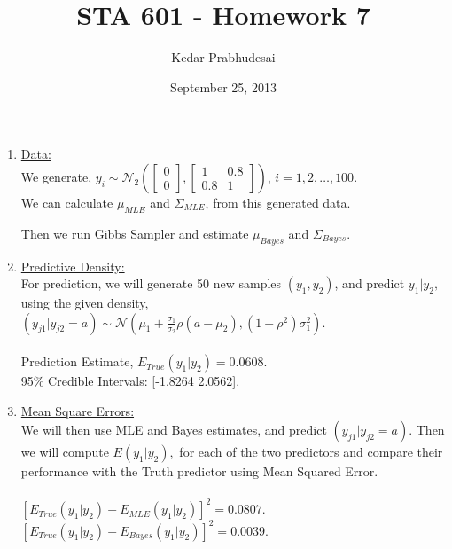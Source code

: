 \documentclass{article}
\title{STA 601 - Homework 7}
\author{Kedar Prabhudesai}
\date{September 25, 2013}
\begin{document}
\maketitle

   
\begin{enumerate}

\item \underline{Data:}\\
We generate, $y_i \sim \mathcal{N}_2\left(\left[\begin{matrix}0\\0\end{matrix}\right],\left[\begin{matrix}1 & 0.8\\0.8 & 1\end{matrix}\right]\right)$, $i = 1,2,\ldots,100.$\\

We can calculate $\mu_{MLE}$ and $\Sigma_{MLE}$, from this generated data.

Then we run Gibbs Sampler and estimate $\mu_{Bayes}$ and $\Sigma_{Bayes}.$\\

\item \underline{Predictive Density:}\\
For prediction, we will generate 50 new samples $(y_1,y_2)$, and predict $y_1|y_2,$ using the given density,\\
$(y_{j1}|y_{j2}=a) \sim \mathcal{N}\left(\mu_1+\frac{\sigma_1}{\sigma_2}\rho(a-\mu_2),(1-\rho^2)\sigma_{1}^{2}\right).$\\
\\
Prediction Estimate, $E_{True}(y_1|y_2) =  0.0608.$\\
95\% Credible Intervals: [-1.8264 2.0562].

\item \underline{Mean Square Errors:}\\
We will then use MLE and Bayes estimates, and predict $(y_{j1}|y_{j2}=a)$. Then we will compute $E(y_1|y_2),$ for each of the two predictors and compare their performance with the Truth predictor using Mean Squared Error.\\
\\
$\left[E_{True}(y_1|y_2) - E_{MLE}(y_1|y_2)\right]^2 = 0.0807.$\\
$\left[E_{True}(y_1|y_2) - E_{Bayes}(y_1|y_2)\right]^2 = 0.0039.$\\


\end{enumerate}
\end{document}
